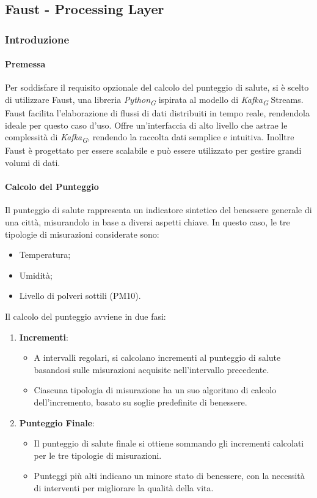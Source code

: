 \subsection{Faust - Processing Layer} \label{sec:faust}
\subsubsection{Introduzione}
\paragraph*{Premessa} 

Per soddisfare il requisito opzionale del calcolo del punteggio di salute, si è scelto di utilizzare Faust, una libreria \textit{Python}\textsubscript{\textit{G}} ispirata al modello di \textit{Kafka}\textsubscript{\textit{G}} Streams. Faust facilita l'elaborazione di flussi di dati distribuiti in tempo reale, rendendola ideale per questo caso d'uso.
Offre un'interfaccia di alto livello che astrae le complessità di \textit{Kafka}\textsubscript{\textit{G}}, rendendo la raccolta dati semplice e intuitiva.
Inolltre Faust è progettato per essere scalabile e può essere utilizzato per gestire grandi volumi di dati.

\paragraph*{Calcolo del Punteggio}
Il punteggio di salute rappresenta un indicatore sintetico del benessere generale di una città, misurandolo in base a diversi aspetti chiave. In questo caso, le tre tipologie di misurazioni considerate sono:
\begin{itemize}
    \item Temperatura;
    \item Umidità;
    \item Livello di polveri sottili (PM10).
\end{itemize}

Il calcolo del punteggio avviene in due fasi:
\begin{enumerate}
    \item \textbf{Incrementi}: 
    \begin{itemize}
        \item A intervalli regolari, si calcolano incrementi al punteggio di salute basandosi sulle misurazioni acquisite nell'intervallo precedente.
        \item Ciascuna tipologia di misurazione ha un suo algoritmo di calcolo dell'incremento, basato su soglie predefinite di benessere.
    \end{itemize}
    \item \textbf{Punteggio Finale}:
    \begin{itemize}
        \item Il punteggio di salute finale si ottiene sommando gli incrementi calcolati per le tre tipologie di misurazioni.
        \item Punteggi più alti indicano un minore stato di benessere, con la necessità di interventi per migliorare la qualità della vita.
    \end{itemize}
\end{enumerate}


